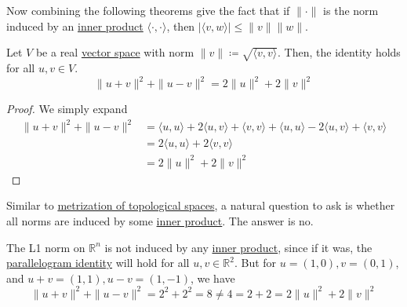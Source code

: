 	Now combining the following theorems give the fact that if $\| \cdot \|$ is the norm induced by an \hyperref[def:inner-product]{inner product} $\langle \cdot , \cdot \rangle$, then $|\langle v, w \rangle| \leq \|v\| \|w\|$. 

	\begin{theorem}
	  \label{thm:parallelogram-identity}
		Let $V$ be a real \hyperref[def:vector-space]{vector space} with norm $\|v\| \coloneqq \sqrt{\langle v, v \rangle}$. Then, the identity holds for all $u, v \in V$. 
		\begin{equation}
		  \|u + v\|^2 + \|u - v\|^2 = 2 \|u\|^2 + 2 \|v\|^2
		\end{equation}
	\end{theorem}
	\begin{proof}
		We simply expand 
		\begin{align}
			\|u + v\|^2 + \|u - v\|^2 & = \langle u, u \rangle + 2 \langle u, v \rangle + \langle v, v \rangle + \langle u, u \rangle - 2 \langle u, v \rangle + \langle v, v \rangle \\ 
																& = 2 \langle u, u \rangle + 2 \langle v, v \rangle \\ 
																& = 2 \|u\|^2 + 2 \|v\|^2
		\end{align}
	\end{proof}

	Similar to \hyperref[pst-def:metrizable_space]{metrization of topological spaces}, a natural question to ask is whether all norms are induced by some \hyperref[def:inner-product]{inner product}. The answer is no. 
	
	\begin{example}[L1 Norm]
	  \label{ex:l1-norm}
		The L1 norm on $\mathbb{R}^n$ is not induced by any \hyperref[def:inner-product]{inner product}, since if it was, the \hyperref[thm:parallelogram-identity]{parallelogram identity} will hold for all $u, v \in \mathbb{R}^2$. But for $u = (1, 0), v = (0, 1)$, and $u + v = (1, 1), u - v = (1, -1)$, we have 
		\begin{equation}
		  \|u + v\|^2 + \|u - v\|^2 = 2^2 + 2^2 = 8 \neq 4 = 2 + 2 = 2\|u\|^2 + 2 \|v\|^2
		\end{equation}
	\end{example}

